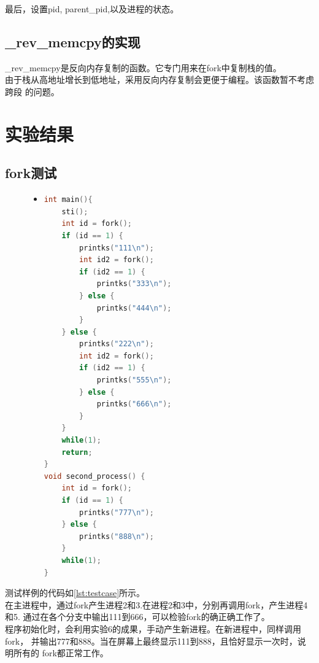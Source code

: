 \documentclass[a4paper]{article}
\begin{document}
    最后，设置pid, parent_pid,以及进程的状态。
    \subsection{_rev_memcpy的实现}
    _rev_memcpy是反向内存复制的函数。它专门用来在fork中复制栈的值。\\ 

    由于栈从高地址增长到低地址，采用反向内存复制会更便于编程。该函数暂不考虑跨段
    的问题。
\section{实验结果}
    \subsection{fork测试}
    \begin{figure}[!hbt]
    \begin{itemize}
    \item[] \begin{lstlisting}[language=C, label=lst:testcase, caption=测试样例代码]
int main(){    
    sti();
    int id = fork();
    if (id == 1) {
        printks("111\n");
        int id2 = fork();
        if (id2 == 1) {
            printks("333\n");
        } else {
            printks("444\n");
        }
    } else {
        printks("222\n");
        int id2 = fork();
        if (id2 == 1) {
            printks("555\n");
        } else {
            printks("666\n");
        }
    }
    while(1);
    return;
}
void second_process() {
    int id = fork();
    if (id == 1) {
        printks("777\n");
    } else {
        printks("888\n");
    }
    while(1);
}
    \end{lstlisting}
    \end{itemize}
    \end{figure}
    测试样例的代码如\ref{lst:testcase}所示。\\ 
    
    在主进程中，通过fork产生进程2和3.在进程2和3中，分别再调用fork，产生进程4和5.
    通过在各个分支中输出111到666，可以检验fork的确正确工作了。\\ 

    程序初始化时，会利用实验6的成果，手动产生新进程。在新进程中，同样调用fork，
    并输出777和888。当在屏幕上最终显示111到888，且恰好显示一次时，说明所有的
    fork都正常工作。\\ 
\end{document}
